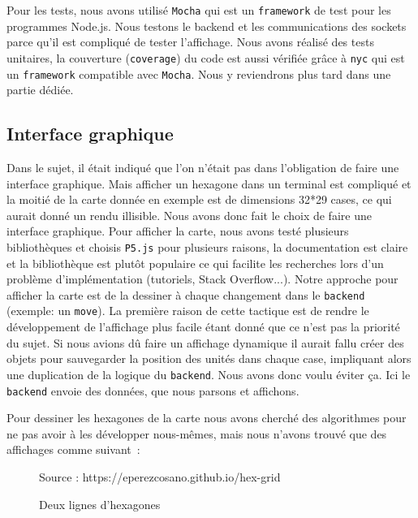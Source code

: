 Pour les tests, nous avons utilisé {\tt Mocha} qui est un {\tt framework} de test pour les programmes Node.js.
Nous testons le backend et les communications des sockets parce qu'il est compliqué de tester l'affichage.
Nous avons réalisé des tests unitaires, la couverture ({\tt coverage}) du code est aussi vérifiée grâce à {\tt nyc} qui est un {\tt framework} compatible avec {\tt Mocha}.
Nous y reviendrons plus tard dans une partie dédiée.

\subsection{Interface graphique}

Dans le sujet, il était indiqué que l'on n'était pas dans l'obligation de faire une interface graphique. Mais afficher un hexagone dans un terminal est compliqué et la moitié de la carte donnée en exemple est de dimensions 32*29 cases, ce qui aurait donné un rendu illisible.
Nous avons donc fait le choix de faire une interface graphique. Pour afficher la carte, nous avons testé plusieurs bibliothèques et choisis \lstinline{P5.js} pour plusieurs raisons, la documentation est claire et la bibliothèque est plutôt populaire ce qui facilite les recherches lors d'un problème d'implémentation (tutoriels, Stack Overflow...).
Notre approche pour afficher la carte est de la dessiner à chaque changement dans le \lstinline{backend} (exemple: un {\tt move}). La première raison de cette tactique est de rendre le développement de l'affichage plus facile étant donné que ce n'est pas la priorité du sujet. Si nous avions dû faire un affichage dynamique il aurait fallu créer des objets pour sauvegarder la position des unités dans chaque case, impliquant alors une duplication de la logique du \lstinline{backend}. Nous avons donc voulu éviter ça. Ici le \lstinline{backend} envoie des données, que nous parsons et affichons.

Pour dessiner les hexagones de la carte nous avons cherché des algorithmes pour ne pas avoir à les développer nous-mêmes, mais nous n'avons trouvé que des affichages comme suivant :

\begin{figure}[H]
    \centering
    \def\stackalignment{r}
    {\scriptsize%
        Source : https://eperezcosano.github.io/hex-grid}
    \caption{Deux lignes d'hexagones}
    \label{fig:hexmap_exemple}
\end{figure}

